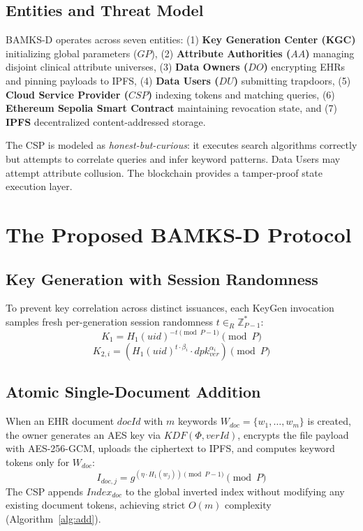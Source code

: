 \documentclass[conference]{IEEEtran}
\begin{document}
\subsection{Entities and Threat Model}
BAMKS-D operates across seven entities: (1) \textbf{Key Generation Center (KGC)} initializing global parameters ($GP$), (2) \textbf{Attribute Authorities ($AA$)} managing disjoint clinical attribute universes, (3) \textbf{Data Owners ($DO$)} encrypting EHRs and pinning payloads to IPFS, (4) \textbf{Data Users ($DU$)} submitting trapdoors, (5) \textbf{Cloud Service Provider ($CSP$)} indexing tokens and matching queries, (6) \textbf{Ethereum Sepolia Smart Contract} maintaining revocation state, and (7) \textbf{IPFS} decentralized content-addressed storage.

The CSP is modeled as \textit{honest-but-curious}: it executes search algorithms correctly but attempts to correlate queries and infer keyword patterns. Data Users may attempt attribute collusion. The blockchain provides a tamper-proof state execution layer.

\section{The Proposed BAMKS-D Protocol}

\subsection{Key Generation with Session Randomness}
To prevent key correlation across distinct issuances, each KeyGen invocation samples fresh per-generation session randomness $t \in_R \mathbb{Z}_{P-1}^*$:
\begin{equation}
K_1 = H_1(uid)^{-t \pmod{P-1}} \pmod P
\end{equation}
\begin{equation}
K_{2,i} = \left( H_1(uid)^{t \cdot \beta_i} \cdot dpk_{ver}^{\alpha_i} \right) \pmod P
\end{equation}

\subsection{Atomic Single-Document Addition}
When an EHR document $docId$ with $m$ keywords $W_{doc} = \{w_1, \dots, w_m\}$ is created, the owner generates an AES key via $KDF(\Phi, verId)$, encrypts the file payload with AES-256-GCM, uploads the ciphertext to IPFS, and computes keyword tokens only for $W_{doc}$:
\begin{equation}
I_{doc,j} = g^{(\eta \cdot H_1(w_j)) \pmod{P-1}} \pmod P
\end{equation}
The CSP appends $Index_{doc}$ to the global inverted index without modifying any existing document tokens, achieving strict $O(m)$ complexity (Algorithm~\ref{alg:add}).
\end{document}
